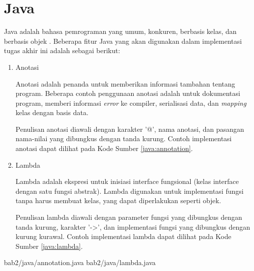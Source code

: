 \section{Java}
\par Java adalah bahasa pemrograman yang umum, konkuren, berbasis kelas, dan berbasis objek \cite{java-online}. Beberapa fitur Java yang akan digunakan dalam implementasi tugas akhir ini adalah sebagai berikut:
\begin{enumerate}[listparindent=2.5em]
	\item Anotasi
	\par Anotasi adalah penanda untuk memberikan informasi tambahan tentang program. Beberapa contoh penggunaan anotasi adalah untuk dokumentasi program, memberi informasi \textit{error} ke compiler, serialisasi data, dan \textit{mapping} kelas dengan basis data. 
	\par Penulisan anotasi diawali dengan karakter '@', nama anotasi, dan pasangan nama-nilai yang dibungkus dengan tanda kurung. Contoh implementasi anotasi dapat dilihat pada Kode Sumber \ref{java:annotation}.
	\item Lambda
	\par Lambda adalah ekspresi untuk inisiasi interface fungsional (kelas interface dengan satu fungsi abstrak). Lambda digunakan untuk implementasi fungsi tanpa harus membuat kelas, yang dapat diperlakukan seperti objek.
	\par Penulisan lambda diawali dengan parameter fungsi yang dibungkus dengan tanda kurung, karakter '->', dan implementasi fungsi yang dibungkus dengan kurung kurawal. Contoh implementasi lambda dapat dilihat pada Kode Sumber \ref{java:lambda}.
\end{enumerate}
 {bab2/java/annotation.java}
 {bab2/java/lambda.java}

